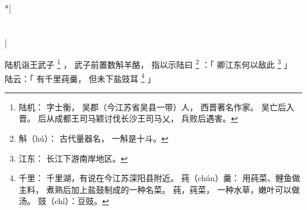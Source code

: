 
\switchcolumn[0]*[\section{}]

陆机诣王武子%
\footnote{%
    陆机：
        字士衡，
        吴郡（今江苏省吴县一带）人，
        西晋著名作家。
        吴亡后入晋。
        后从成都王司马颖讨伐长沙王司马乂，
        兵败后遇害。
}%
，
武子前置数斛羊酪，
指以示陆曰%
\footnote{%
    斛（hú）：
        古代量器名，
        一斛是十斗。
}%
：「
    卿江东何以敌此%
    \footnote{%
        江东：
            长江下游南岸地区。
    }%
」
陆云：「
    有千里莼羹，
    但未下盐豉耳%
    \footnote{%
        千里：
            千里湖，有说在今江苏深阳县附近。
        莼（chún）羹：
            用莼菜、鲤鱼做主料，
            煮熟后加上盐鼓制成的一种名菜。
            莼，莼菜，
            一种水草，嫩叶可以做汤。
            豉（chǐ）：豆豉。
    }%
」

\switchcolumn




